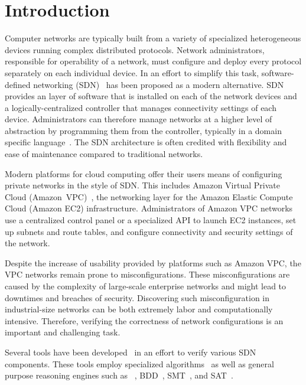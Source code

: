 \section{Introduction}
\label{sect:aws/introduction}
Computer networks are typically built from a variety of specialized heterogeneous devices running complex distributed 
protocols. Network administrators, responsible for operability of a network, must configure and deploy every protocol 
separately on each individual device. In an effort to simplify this task, software-defined networking (SDN)~\cite{SDN} 
has been proposed as a modern alternative. SDN provides an layer of software that is installed on each of the network 
devices and a logically-centralized controller that manages connectivity settings of each device. Administrators can 
therefore manage networks at a higher level of abstraction by programming them from the controller, typically in a domain 
specific language~\cite{DBLP:journals/cm/FosterGRSFKMRRSWH13}. The SDN architecture is often credited with flexibility and ease 
of maintenance compared to traditional networks.

Modern platforms for cloud computing offer their users means of configuring private networks in the style of SDN. This includes 
Amazon Virtual Private Cloud (Amazon~VPC)~\cite{AmazonVPC}, the networking layer for the Amazon Elastic Compute Cloud (Amazon EC2) 
infrastructure. Administrators of Amazon VPC networks use a centralized control panel or a specialized API to launch EC2 instances, 
set up subnets and route tables, and configure connectivity and security settings of the network.

Despite the increase of usability provided by platforms such as Amazon VPC, the VPC networks remain prone to misconfigurations. These 
misconfigurations are caused by the complexity of large-scale enterprise networks and might lead to downtimes and breaches of 
security. Discovering such misconfiguration in industrial-size networks can be both extremely labor and computationally intensive. Therefore, 
verifying the correctness of network configurations is an important and challenging task.

Several tools have been 
developed~\cite{batfish,jayaraman2014automated,DBLP:conf/icdcit/BjornerJ15,DBLP:conf/pldi/BallBGIKSSV14,Veriflow,ConfigChecker,Anteater,DBLP:conf/cav/El-HassanyTVV17} in an effort to verify various SDN components. These tools employ specialized algorithms~\cite{Veriflow} as well as general purpose 
reasoning engines such as 
\Datalog~\cite{muZ, DBLP:conf/cav/El-HassanyTVV17}, BDD~\cite{ConfigChecker}, SMT~\cite{jayaraman2014automated,DBLP:conf/icdcit/BjornerJ15}, 
and SAT~\cite{Anteater,DBLP:conf/pldi/BallBGIKSSV14}.

